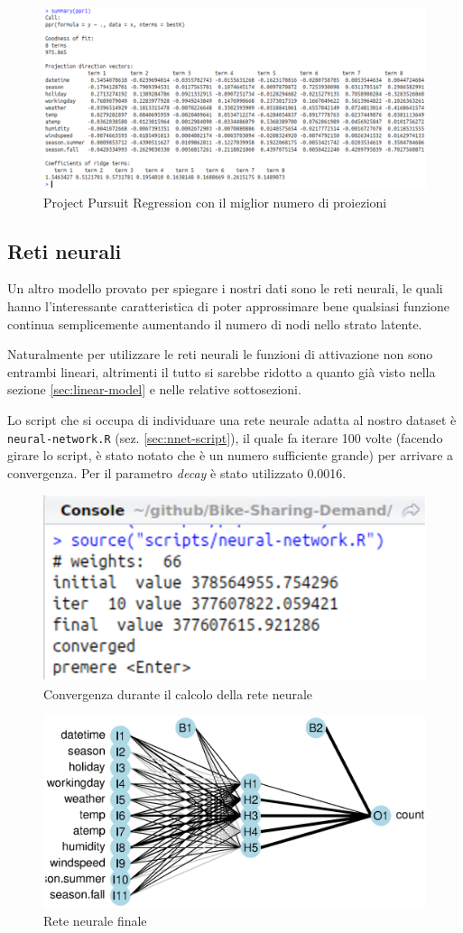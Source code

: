 \begin{figure}[H]
  \centering
  \includegraphics[width=.7\columnwidth]{images/non-linear/ppr-result.eps}
  \caption{Project Pursuit Regression con il miglior numero di proiezioni}
  \label{fig:ppr-result}
\end{figure}


\subsection{Reti neurali}\label{sec:neural-nets}
Un altro modello provato per spiegare i nostri dati sono le reti neurali, le
quali hanno l'interessante caratteristica di poter approssimare bene qualsiasi
funzione continua semplicemente aumentando il numero di nodi nello strato
latente.

Naturalmente per utilizzare le reti neurali le funzioni di attivazione non sono
entrambi lineari, altrimenti il tutto si sarebbe ridotto a quanto già visto
nella sezione \ref{sec:linear-model} e nelle relative sottosezioni.

Lo script che si occupa di individuare una rete neurale adatta al nostro
dataset è \texttt{neural-network.R} (sez. \ref{sec:nnet-script}), il quale
fa iterare 100 volte (facendo girare lo script, è stato notato che è un numero
sufficiente grande) per arrivare a convergenza. Per il parametro \emph{decay}
è stato utilizzato 0.0016.

\begin{figure}[H]
  \centering
  \includegraphics[width=.7\columnwidth]{images/non-linear/nnet-progress.eps}
  \caption{Convergenza durante il calcolo della rete neurale}
  \label{fig:nnet-progress}
\end{figure}

\begin{figure}[H]
  \centering
  \includegraphics[width=.7\columnwidth]{images/non-linear/neural-network.eps}
  \caption{Rete neurale finale}
  \label{fig:nnet}
\end{figure}
